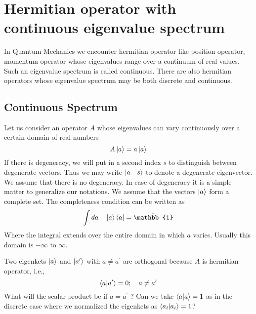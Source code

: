 	
	
	\section{Hermitian operator with continuous eigenvalue spectrum}
	In Quantum Mechanics we encounter hermitian operator like position operator, momentum operator whose eigenvalues range over a continuum of real values. Such an eigenvalue spectrum is called continuous. There are also hermitian operators whose eigenvalue spectrum may be both discrete and continuous.
	
		\subsection{Continuous Spectrum}
		Let us consider an operator $A$ whose eigenvalues can vary continuously over a certain domain of real numbers
		\begin{equation}
			A \ket{a} = a \ket{a}
			\label{chapter5.eqn9-eigenvalue}
		\end{equation}
		If there is degeneracy, we will put in a second index $s$ to distinguish between degenerate vectors. Thus we may write $\ket{a\quad s}$ to denote a degenerate eigenvector. We assume that there is no degeneracy. In case of degeneracy it is a simple matter to generalize our notations. We assume that the vectors $\ket{a}$ form a complete set. The completeness condition can be written as
		\begin{equation}
			\int da \quad \ket{a}\bra{a} = \hat{\mathbb{1}}
			\label{chapter5.eqn10-completenss-continuous}
		\end{equation}
		Where the integral extends over the entire domain in which $a$ varies. Usually this domain is $-\infty$ to $\infty$.
		
		Two eigenkets $\ket{a}$ and $\ket{a^\prime}$ with $a\neq a^\prime$ are orthogonal because $A$ is  hermitian operator, i.e.,
		\begin{equation}
			\braket{a}{a^\prime} = 0 ; \quad  a \neq a^\prime
			\label{chapter5.eqn11-orthogonal-continuous}
		\end{equation}
		What will the scalar product be if $a=a^\prime$ ? Can we take $\braket{a}{a} = 1$ as in the discrete case where we normalized the eigenkets as $\braket{a_i}{a_i} = 1$?
		
